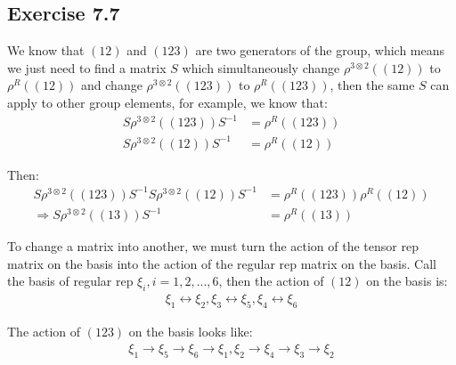 \documentclass[]{ctexart}
\begin{document}
\subsection{Exercise 7.7}
We know that $(12)$ and $(123)$ are two generators of the group, which means we just need to find a matrix $S$ which simultaneously change $\rho^{3\otimes2}((12))$ to $\rho^{R}((12))$ and change $\rho^{3\otimes2}((123))$ to $\rho^{R}((123))$, then the same $S$ can apply to other group elements, for example, we know that:
	\begin{equation*}
	\begin{aligned}
		S\rho^{3\otimes2}((123))S^{-1}&=\rho^{R}((123))\\
		S\rho^{3\otimes2}((12))S^{-1}&=\rho^{R}((12))
	\end{aligned}
	\end{equation*}

Then:
	\begin{equation*}
	\begin{aligned}
		S\rho^{3\otimes2}((123))S^{-1}S\rho^{3\otimes2}((12))S^{-1}&=\rho^{R}((123))\rho^{R}((12))\\
		\Rightarrow S\rho^{3\otimes2}((13))S^{-1}&=\rho^{R}((13))
	\end{aligned}
	\end{equation*}
	
To change a matrix into another, we must turn the action of the tensor rep matrix on the basis into the action of the regular rep matrix on the basis. Call the basis of regular rep $\xi_i,i=1,2,...,6$, then the action of $(12)$ on the basis is:
	\begin{equation*}
	\begin{aligned}
		\xi_1\leftrightarrow \xi_2, \xi_3\leftrightarrow \xi_5,\xi_4\leftrightarrow \xi_6
	\end{aligned}
	\end{equation*}

The action of $(123)$ on the basis looks like:
	\begin{equation*}
	\begin{aligned}
		\xi_1\to \xi_5 \to \xi_6\to \xi_1, \xi_2\to \xi_4\to \xi _3\to \xi _2
	\end{aligned}
	\end{equation*}
	
\end{document}
